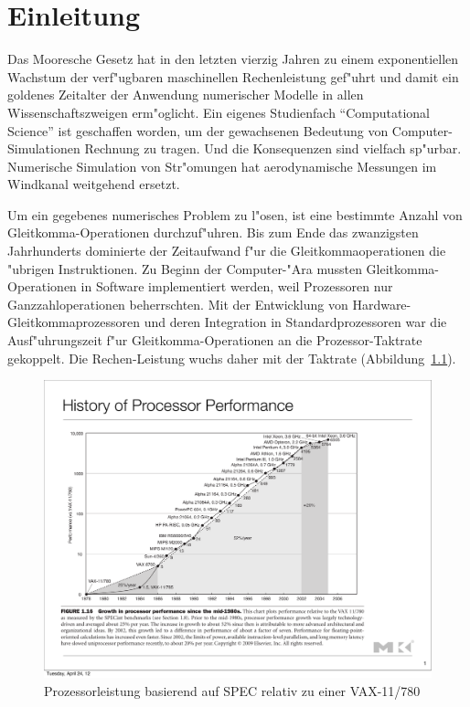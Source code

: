 \chapter{Einleitung}
\rhead{}
Das Mooresche Gesetz hat in den letzten vierzig Jahren zu einem
exponentiellen Wachstum der verf"ugbaren maschinellen Rechenleistung
gef"uhrt und damit ein goldenes Zeitalter der Anwendung numerischer
Modelle in allen Wissenschaftszweigen erm"oglicht.
Ein eigenes Studienfach ``Computational Science'' ist geschaffen worden,
um der gewachsenen Bedeutung von Computer-Simulationen Rechnung zu
tragen. Und die Konsequenzen sind vielfach sp"urbar.
Numerische Simulation von Str"omungen hat aerodynamische Messungen
im Windkanal weitgehend ersetzt.

Um ein gegebenes numerisches Problem zu l"osen, ist eine bestimmte
Anzahl von Gleit\-komma-Operationen durchzuf"uhren.
Bis zum Ende das zwanzigsten Jahrhunderts dominierte der Zeitaufwand f"ur
die Gleitkommaoperationen die "ubrigen Instruktionen.
Zu Beginn der Computer-"Ara mussten Gleitkomma-Operationen in Software
implementiert werden, weil Prozessoren nur Ganzzahloperationen 
beherrschten. Mit der Entwicklung von Hardware-Gleitkommaprozessoren
und deren Integration in Standardprozessoren war die Ausf"uhrungszeit
f"ur Gleitkomma-Operationen an die Prozessor-Taktrate gekoppelt.
Die Rechen-Leistung wuchs daher mit der Taktrate
(Abbildung~\ref{processorperformance}).
\begin{figure}
\begin{center}
\includegraphics[width=\hsize]{images/processorperformance.pdf}
\end{center}
\caption{Prozessorleistung basierend auf SPEC relativ zu einer VAX-11/780}
\label{processorperformance}
\end{figure}

